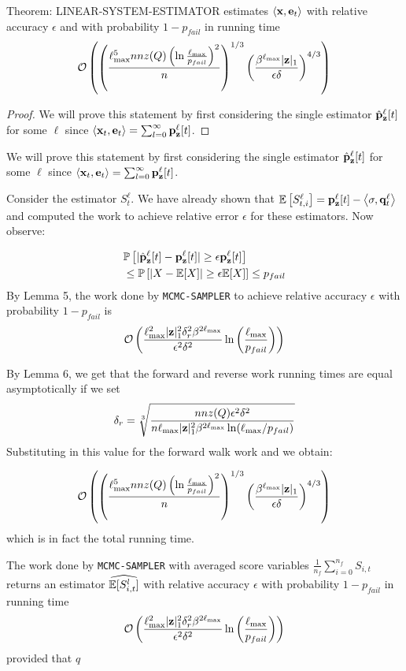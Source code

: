 \begin{theorem}
Theorem: LINEAR-SYSTEM-ESTIMATOR estimates $\left< \mathbf{x}, \mathbf{e}_t \right>$ with relative accuracy $\epsilon$ and with probability $1-p_{fail}$ in running time 
$$ \mathcal{O}\left( \left(\frac{\ell_{\max}^5 nnz(Q)\left(\ln \frac{\ell_{\max}}{p_{fail}} \right)^2}{n} \right)^{1/3} \left( \frac{\beta^{\ell_{\max}} |\mathbf{z}|_1}{\epsilon \delta}\right)^{4/3} \right) $$

\end{theorem}
\begin{proof}
We will prove this statement by first considering the single estimator $\hat{\mathbf{p}}_\mathbf{z}^{\ell}[t]$ for some $\ell$ since $\left< \mathbf{x}_t, \mathbf{e}_t \right> = \sum_{l=0}^{\infty} {\mathbf{p}}_\mathbf{z}^{\ell}[t]$.

\end{proof}
We will prove this statement by first considering the single estimator $\hat{\mathbf{p}}_\mathbf{z}^{\ell}[t]$ for some $\ell$ since $\left< \mathbf{x}_t, \mathbf{e}_t \right> = \sum_{l=0}^{\infty} {\mathbf{p}}_\mathbf{z}^{\ell}[t]$.

Consider the estimator $S_{t}^{\ell}$. We have already shown that ${\mathbb{E}}\left[S_{t, i}^{\ell}\right] = {\mathbf{p}}_\mathbf{z}^{\ell}[t] - \left< \sigma, \mathbf{q}^{\ell}_t \right>$ and computed the work to achieve relative error $\epsilon$ for these estimators. Now observe:

\begin{align*}
&\mathbb{P}\left[ | \hat{\mathbf{p}}_\mathbf{z}^{\ell}[t] - {\mathbf{p}}_\mathbf{z}^{\ell}[t]| \geq  \epsilon {\mathbf{p}}_\mathbf{z}^{\ell}[t] \right] \\
&\leq \mathbb{P}\left[ |X -\mathbb{E}[X]| \geq \epsilon \mathbb{E}[X]\right] \leq p_{fail}
\end{align*}
By Lemma 5, the work done by \texttt{MCMC-SAMPLER} to achieve relative accuracy $\epsilon$ with probability $1-p_{fail}$ is 
$$ \mathcal{O}\left( \frac{\ell_{\max}^2 |\mathbf{z}|_1^2 \delta_r^2 \beta^{2\ell_{\max}}}{\epsilon^2\delta^2}\ln \left(\frac{\ell_{\max}}{p_{fail}}\right)\right) $$

By Lemma 6, we get that the forward and reverse work running times are equal asymptotically if we set 
$$\delta_r = \sqrt[3]{\frac{nnz(Q) \epsilon^2\delta^2}{n\ell_{\max} |\mathbf{z}|_1^2\beta^{2\ell_{\max}}\ln(\ell_{\max}/p_{fail}) } }$$
Substituting in this value for the forward walk work and we obtain:

$$ \mathcal{O}\left( \left(\frac{\ell_{\max}^5 nnz(Q)\left(\ln \frac{\ell_{\max}}{p_{fail}} \right)^2}{n} \right)^{1/3} \left( \frac{\beta^{\ell_{\max}} |\mathbf{z}|_1}{\epsilon \delta}\right)^{4/3} \right) $$
which is in fact the total running time.
\begin{lemma}
The work done by \texttt{MCMC-SAMPLER} with averaged score variables $\frac{1}{n_f}\sum_{i=0}^{n_f} S_{i, t}$ returns an estimator $\widehat{{\mathbb{E}}[S_{i, t}^l]}$ with relative accuracy $\epsilon$ with probability $1-p_{fail}$ in running time
$$\mathcal{O}\left( \frac{\ell_{\max}^2 |\mathbf{z}|_1^2 \delta_r^2 \beta^{2\ell_{\max}}}{\epsilon^2\delta^2}\ln \left(\frac{\ell_{\max}}{p_{fail}}\right)\right)$$
provided that $q$
\end{lemma}

